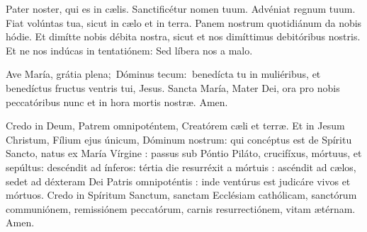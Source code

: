 
Pater noster, qui es in cælis. Sanctificétur nomen tuum. Advéniat regnum tuum. Fiat volúntas tua, sicut in cælo et in terra. Panem nostrum quotidiánum da nobis hódie. Et dimítte nobis débita nostra, sicut et nos dimíttimus debitóribus nostris. Et ne nos indúcas in tentatiónem: Sed líbera nos a malo. 

Ave María, grátia plena; Dóminus tecum:  benedícta tu in muliéribus, et benedíctus fru\-ctus ventris tui, Jesus. Sancta María, Mater Dei, ora pro nobis peccatóribus nunc et in hora mortis nostræ. Amen.

Credo in Deum, Patrem omnipoténtem, Creatórem cæli et terræ. Et in Jesum Christum, Fílium ejus únicum, Dóminum nostrum: qui concé\-ptus est de Spíritu San\-cto, natus ex María Vírgine : passus sub Póntio Piláto, crucifíxus, mórtuus, et sepúltus: descéndit ad ínferos: tértia die resurréxit a mórtuis : ascéndit ad cælos, sedet ad déxteram Dei Patris omnipot\-éntis : inde ventúrus est judicáre vivos et mórtuos. Credo in Spíritum San\-ctum, sanctam Ecclésiam cathólicam, san\-ctórum communiónem, remissiónem peccatórum, carnis resurrectiónem, vitam ætérnam. Amen.